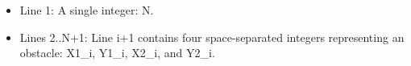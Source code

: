 \begin{itemize}
	\item      Line 1: A single integer: N.    
	\item      Lines 2..N+1: Line i+1 contains four space-separated integers         representing an obstacle: X1\_i, Y1\_i, X2\_i, and Y2\_i.    
\end{itemize}
